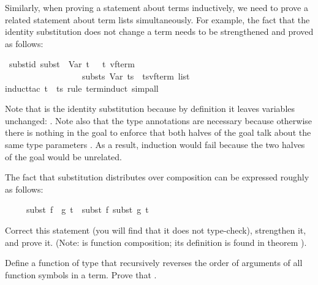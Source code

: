 \begin{isabellebody}
\begin{isamarkuptext}
Similarly, when proving a statement about terms inductively, we need
to prove a related statement about term lists simultaneously. For example,
the fact that the identity substitution does not change a term needs to be
strengthened and proved as follows:%
\end{isamarkuptext}%
\isamarkuptrue%
\isamarkupfalse%
\ subst{\isacharunderscore}id{\isacharcolon}\ {\isachardoublequoteopen}subst\ \ Var\ t\ \ {\isacharequal}\ {\isacharparenleft}t\ {\isacharcolon}{\isacharcolon}{\isacharparenleft}{\isacharprime}v{\isacharcomma}{\isacharprime}f{\isacharparenright}term{\isacharparenright}\ \ {\isasymand}\isanewline
\ \ \ \ \ \ \ \ \ \ \ \ \ \ \ \ \ \ substs\ Var\ ts\ {\isacharequal}\ {\isacharparenleft}ts{\isacharcolon}{\isacharcolon}{\isacharparenleft}{\isacharprime}v{\isacharcomma}{\isacharprime}f{\isacharparenright}term\ list{\isacharparenright}{\isachardoublequoteclose}\isanewline
%
\isadelimproof
%
\endisadelimproof
%
\isatagproof
{}\isamarkupfalse%
{\isacharparenleft}induct{\isacharunderscore}tac\ t\ \ ts\ rule{\isacharcolon}\ term{\isachardot}induct{\isacharcomma}\ simp{\isacharunderscore}all{\isacharparenright}\isanewline
{}\isamarkupfalse%
%
\endisatagproof
{\isafoldproof}%
%
\isadelimproof
%
\endisadelimproof
%
\begin{isamarkuptext}%
\noindent
Note that  is the identity substitution because by definition it
leaves variables unchanged: . Note also
that the type annotations are necessary because otherwise there is nothing in
the goal to enforce that both halves of the goal talk about the same type
parameters . As a result, induction would fail
because the two halves of the goal would be unrelated.

\begin{exercise}
The fact that substitution distributes over composition can be expressed
roughly as follows:
\begin{isabelle}%
\ \ \ \ \ subst\ {\isacharparenleft}f\ {\isasymcirc}\ g{\isacharparenright}\ t\ {\isacharequal}\ subst\ f\ {\isacharparenleft}subst\ g\ t{\isacharparenright}%
\end{isabelle}
Correct this statement (you will find that it does not type-check),
strengthen it, and prove it. (Note: \isa{{\isasymcirc}} is function composition;
its definition is found in theorem ).
\end{exercise}
\begin{exercise}\label{ex:trev-trev}
  Define a function  of type 
that recursively reverses the order of arguments of all function symbols in a
  term. Prove that .
\end{exercise}


\end{isamarkuptext}
\end{isabellebody}
